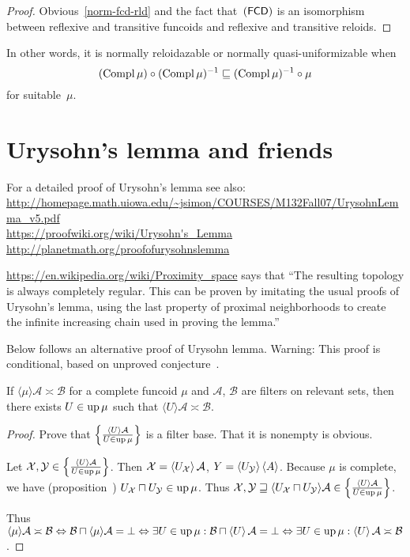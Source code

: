 \begin{proof}
Obvious~\ref{norm-fcd-rld} and the fact that~$(\mathsf{FCD})$ is an isomorphism between reflexive and transitive funcoids
and reflexive and transitive reloids.
\end{proof}

In other words, it is normally reloidazable or normally quasi-uniformizable when
\[ (\operatorname{Compl}\mu)\circ(\operatorname{Compl}\mu)^{-1}\sqsubseteq(\operatorname{Compl}\mu)^{-1}\circ\mu \]
for suitable~$\mu$.

\section{Urysohn's lemma and friends}

For a detailed proof of Urysohn's lemma see also:\\
\url{http://homepage.math.uiowa.edu/~jsimon/COURSES/M132Fall07/UrysohnLemma_v5.pdf}\\
\url{https://proofwiki.org/wiki/Urysohn's_Lemma}\\
\url{http://planetmath.org/proofofurysohnslemma}

\url{https://en.wikipedia.org/wiki/Proximity_space} says that
``The resulting topology is always completely regular. This can be proven by imitating the usual proofs of Urysohn's lemma, using the last property of proximal neighborhoods to create the infinite increasing chain used in proving the lemma.''

Below follows an alternative proof of Urysohn lemma. Warning: This proof is conditional,
based on unproved conjecture~.

\begin{lem}
  If $\langle \mu \rangle \mathcal{A} \asymp \mathcal{B}$ for a complete
  funcoid $\mu$ and $\mathcal{A}$, $\mathcal{B}$ are filters on relevant
  sets, then there exists $U \in \operatorname{up} \mu$ such that $\langle U
  \rangle \mathcal{A} \asymp \mathcal{B}$.
\end{lem}

\begin{proof}
  Prove that $\left\{ \frac{ \left\langle U\right\rangle \mathcal{A} }{
  U \in \operatorname{up} \mu }\right\}$ is a filter base. That it
  is nonempty is obvious.
  
  Let $\mathcal{X}, \mathcal{Y} \in \left\{ \frac{ \left\langle U\right\rangle \mathcal{A}
  }{ U \in \operatorname{up} \mu }\right\}$. Then
  $\mathcal{X} = \left\langle U_{\mathcal{X}}\right\rangle \mathcal{A}$, $Y = \left\langle 
  U_{\mathcal{Y}}\right\rangle \left\langle A\right\rangle$. Because $\mu$ is complete, we have
  (proposition~) $U_{\mathcal{X}} \sqcap U_{\mathcal{Y}} \in \operatorname{up}
  \mu$. Thus $\mathcal{X}, \mathcal{Y} \sqsupseteq \langle
  U_{\mathcal{X}} \sqcap U_{\mathcal{Y}} \rangle \mathcal{A} \in \left\{ \frac{
  \left\langle U\right\rangle \mathcal{A} }{ U \in \operatorname{up} \mu }\right\}$.
  
  Thus $\langle \mu \rangle \mathcal{A} \asymp \mathcal{B}
  \Leftrightarrow \mathcal{B} \sqcap \langle \mu \rangle \mathcal{A} =
  \bot \Leftrightarrow \exists U \in \operatorname{up} \mu: \mathcal{B} \sqcap
  \left\langle U\right\rangle \mathcal{A} = \bot \Leftrightarrow \exists U \in \operatorname{up}
  \mu: \left\langle U\right\rangle \mathcal{A} \asymp \mathcal{B}$.
\end{proof}

